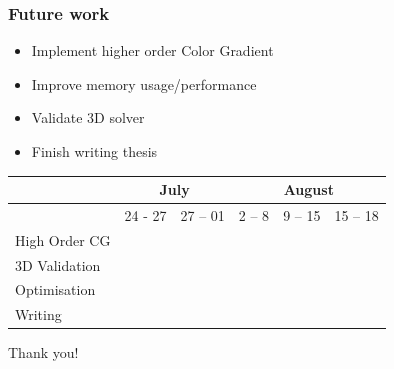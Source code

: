 \documentclass[xcolor=table]{beamer}
\begin{document}
				\begin{frame}
					\frametitle{Future work}
					\begin{itemize}
						\item Implement higher order Color Gradient
						\item Improve memory usage/performance
						\item Validate 3D solver
						\item Finish writing thesis
					\end{itemize}
				\begin{table}[]
					\centering
					\begin{tabular}{l|l|l|l|l|l}
						& \multicolumn{2}{c|}{July}                                                  & \multicolumn{3}{c|}{August}                                                    \\ \hline
						& 24 - 27                                         & 27 – 01                  & 2 – 8                    & 9 – 15                   & 15 – 18                  \\ \hline
						High Order CG & \cellcolor[HTML]{EFEFEF}                        &                          &                          &                          &                          \\ \hline
						3D Validation   & \cellcolor[HTML]{C0C0C0}{\color[HTML]{C0C0C0} } &                          &                          &                          &                          \\ \hline
						Optimisation    &                                                 & \cellcolor[HTML]{656565} & \cellcolor[HTML]{656565} &                          &                          \\ \hline
						Writing         &                                                 &                          & \cellcolor[HTML]{000000} & \cellcolor[HTML]{000000} & \cellcolor[HTML]{000000}
					\end{tabular}
				\end{table}
				\end{frame}
				\begin{frame}
					\centering
						\Huge \textcolor{cranfieldblue}{Thank you!}
				\end{frame}
\end{document}
